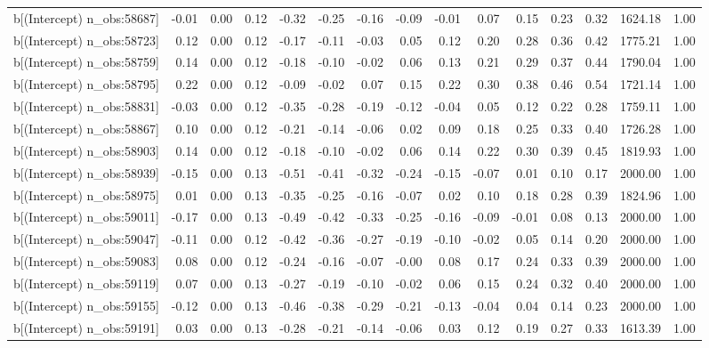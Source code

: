 \begin{table}[ht]
\begin{tabular}{rrrrrrrrrrrrrrr}
  b[(Intercept) n\_obs:58687] & -0.01 & 0.00 & 0.12 & -0.32 & -0.25 & -0.16 & -0.09 & -0.01 & 0.07 & 0.15 & 0.23 & 0.32 & 1624.18 & 1.00 \\ 
  b[(Intercept) n\_obs:58723] & 0.12 & 0.00 & 0.12 & -0.17 & -0.11 & -0.03 & 0.05 & 0.12 & 0.20 & 0.28 & 0.36 & 0.42 & 1775.21 & 1.00 \\ 
  b[(Intercept) n\_obs:58759] & 0.14 & 0.00 & 0.12 & -0.18 & -0.10 & -0.02 & 0.06 & 0.13 & 0.21 & 0.29 & 0.37 & 0.44 & 1790.04 & 1.00 \\ 
  b[(Intercept) n\_obs:58795] & 0.22 & 0.00 & 0.12 & -0.09 & -0.02 & 0.07 & 0.15 & 0.22 & 0.30 & 0.38 & 0.46 & 0.54 & 1721.14 & 1.00 \\ 
  b[(Intercept) n\_obs:58831] & -0.03 & 0.00 & 0.12 & -0.35 & -0.28 & -0.19 & -0.12 & -0.04 & 0.05 & 0.12 & 0.22 & 0.28 & 1759.11 & 1.00 \\ 
  b[(Intercept) n\_obs:58867] & 0.10 & 0.00 & 0.12 & -0.21 & -0.14 & -0.06 & 0.02 & 0.09 & 0.18 & 0.25 & 0.33 & 0.40 & 1726.28 & 1.00 \\ 
  b[(Intercept) n\_obs:58903] & 0.14 & 0.00 & 0.12 & -0.18 & -0.10 & -0.02 & 0.06 & 0.14 & 0.22 & 0.30 & 0.39 & 0.45 & 1819.93 & 1.00 \\ 
  b[(Intercept) n\_obs:58939] & -0.15 & 0.00 & 0.13 & -0.51 & -0.41 & -0.32 & -0.24 & -0.15 & -0.07 & 0.01 & 0.10 & 0.17 & 2000.00 & 1.00 \\ 
  b[(Intercept) n\_obs:58975] & 0.01 & 0.00 & 0.13 & -0.35 & -0.25 & -0.16 & -0.07 & 0.02 & 0.10 & 0.18 & 0.28 & 0.39 & 1824.96 & 1.00 \\ 
  b[(Intercept) n\_obs:59011] & -0.17 & 0.00 & 0.13 & -0.49 & -0.42 & -0.33 & -0.25 & -0.16 & -0.09 & -0.01 & 0.08 & 0.13 & 2000.00 & 1.00 \\ 
  b[(Intercept) n\_obs:59047] & -0.11 & 0.00 & 0.12 & -0.42 & -0.36 & -0.27 & -0.19 & -0.10 & -0.02 & 0.05 & 0.14 & 0.20 & 2000.00 & 1.00 \\ 
  b[(Intercept) n\_obs:59083] & 0.08 & 0.00 & 0.12 & -0.24 & -0.16 & -0.07 & -0.00 & 0.08 & 0.17 & 0.24 & 0.33 & 0.39 & 2000.00 & 1.00 \\ 
  b[(Intercept) n\_obs:59119] & 0.07 & 0.00 & 0.13 & -0.27 & -0.19 & -0.10 & -0.02 & 0.06 & 0.15 & 0.24 & 0.32 & 0.40 & 2000.00 & 1.00 \\ 
  b[(Intercept) n\_obs:59155] & -0.12 & 0.00 & 0.13 & -0.46 & -0.38 & -0.29 & -0.21 & -0.13 & -0.04 & 0.04 & 0.14 & 0.23 & 2000.00 & 1.00 \\ 
  b[(Intercept) n\_obs:59191] & 0.03 & 0.00 & 0.13 & -0.28 & -0.21 & -0.14 & -0.06 & 0.03 & 0.12 & 0.19 & 0.27 & 0.33 & 1613.39 & 1.00 \\ 

\end{tabular}
\end{table}
